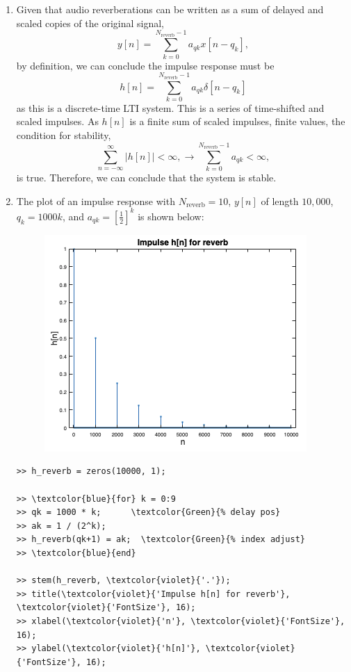 \documentclass[12pt]{article}
\begin{document}
\begin{enumerate}[label=\textbf{\alph*)}, leftmargin=2.6em]
\item Given that audio reverberations can be written as a sum of delayed and scaled copies of the original signal,
\begin{equation}
    y[n] = \sum_{k=0}^{N_\text{reverb}-1} a_{qk}x[n-q_k],
\end{equation}
by definition, we can conclude the impulse response must be
\begin{equation}
    h[n] = \sum_{k=0}^{N_\text{reverb}-1} a_{qk}\delta[n-q_k]
\end{equation}
as this is a discrete-time LTI system. This is a series of time-shifted and scaled impulses. As $h[n]$ is a finite sum of scaled impulses, finite values, the condition for stability,
\begin{equation}
    \sum_{n=-\infty}^\infty |h[n]| < \infty, \rightarrow \sum_{k=0}^{N_\text{reverb}-1} a_{qk}< \infty,
\end{equation}
is true. Therefore, we can conclude that the system is stable.

\item The plot of an impulse response with $N_\text{reverb}=10$, $y[n]$ of length $10,000$, $q_k=1000k$, and $a_{qk}=[\frac{1}{2}]^k$ is shown below:
\begin{figure}[H]
    \centering
    \includegraphics[width=0.5\linewidth]{plot2.png}
\end{figure}
\begin{Verbatim}[frame=single, commandchars=\\\{\}]
>> h_reverb = zeros(10000, 1);

>> \textcolor{blue}{for} k = 0:9
>> qk = 1000 * k;      \textcolor{Green}{% delay pos}
>> ak = 1 / (2^k);
>> h_reverb(qk+1) = ak;  \textcolor{Green}{% index adjust}
>> \textcolor{blue}{end}

>> stem(h_reverb, \textcolor{violet}{'.'});
>> title(\textcolor{violet}{'Impulse h[n] for reverb'}, \textcolor{violet}{'FontSize'}, 16);
>> xlabel(\textcolor{violet}{'n'}, \textcolor{violet}{'FontSize'}, 16);
>> ylabel(\textcolor{violet}{'h[n]'}, \textcolor{violet}{'FontSize'}, 16);
\end{Verbatim}


\end{enumerate}
\end{document}

